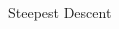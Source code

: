 \begin{frame}
\begin{columns}[t]
\begin{column}{0.5\textwidth}
\begin{greenblock}{Steepest Descent}
\begin{algorithm}[H]
        \end{algorithm}

      \end{greenblock}

    \end{column}

  \end{columns}

\end{frame}







